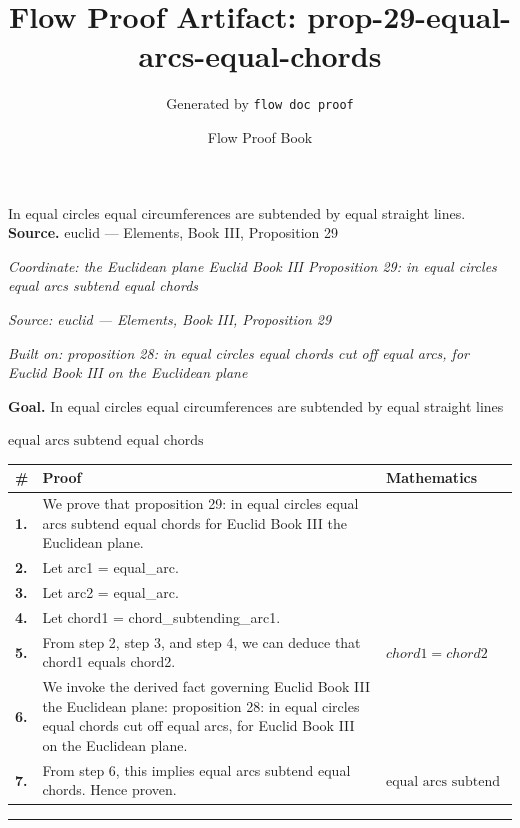 \documentclass[11pt]{article}
\title{Flow Proof Artifact: prop-29-equal-arcs-equal-chords}
\author{Generated by \texttt{flow doc proof}}
\date{Flow Proof Book}
\theoremstyle{definition}
\begin{document}
\maketitle
In equal circles equal circumferences are subtended by equal straight lines.\\[0.5em]
\textbf{Source.} euclid — Elements, Book III, Proposition 29\\[0.5em]
\bigskip
{}\par
\smallskip\noindent\textit{Coordinate: the Euclidean plane \cdot Euclid Book III \cdot Proposition 29: in equal circles equal arcs subtend equal chords}\par
\smallskip\noindent\textit{Source: euclid — Elements, Book III, Proposition 29}\par
\smallskip\noindent\textit{Built on: proposition 28: in equal circles equal chords cut off equal arcs, for Euclid Book III on the Euclidean plane}\par
\medskip
\noindent\textbf{Goal.} In equal circles equal circumferences are subtended by equal straight lines\par
\noindent$\displaystyle \text{equal arcs subtend equal chords}$\par
\medskip
\noindent
\begin{tabular}{@{} >{\raggedright\arraybackslash}p{} >{\raggedright\arraybackslash}p{} >{\raggedleft\arraybackslash}p{} @{}}
\textbf{\#} & \textbf{Proof} & \textbf{Mathematics} \\
\midrule
\textbf{1.} & We prove that proposition 29: in equal circles equal arcs subtend equal chords for Euclid Book III the Euclidean plane. & \\[0.45em]
\textbf{2.} & Let arc1 = equal\_arc. & \\[0.45em]
\textbf{3.} & Let arc2 = equal\_arc. & \\[0.45em]
\textbf{4.} & Let chord1 = chord\_subtending\_arc1. & \\[0.45em]
\textbf{5.} & From step 2, step 3, and step 4, we can deduce that chord1 equals chord2. & $\displaystyle chord1 = chord2$ \\[0.45em]
\textbf{6.} & We invoke the derived fact governing Euclid Book III the Euclidean plane: proposition 28: in equal circles equal chords cut off equal arcs, for Euclid Book III on the Euclidean plane. & \\[0.45em]
\textbf{7.} & From step 6, this implies equal arcs subtend equal chords. Hence proven. & $\displaystyle \text{equal arcs subtend equal chords}$ \\[0.45em]
\bottomrule
\end{tabular}
\label{thm:Geometry-Euclid Book III-proposition_29_in_equal_circles_equal_arcs_subtend_equal_chords}
\par\medskip\hrule
\end{document}
